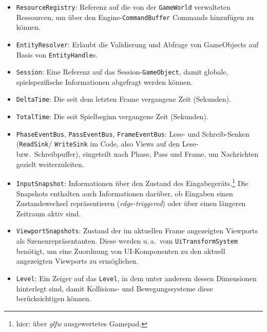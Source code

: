 \begin{itemize}
    \itemsep0.5em
    \item \texttt{ResourceRegistry}: Referenz auf die von der \texttt{GameWorld} verwalteten Ressourcen, um über den Engine-\texttt{CommandBuffer} Commands hinzufügen zu können.
    \item \texttt{EntityResolver}: Erlaubt die Validierung und Abfrage von GameObjects auf Basis von \texttt{EntityHandle}s.
    \item \texttt{Session}: Eine Referenz auf das Session-\texttt{GameObject}, damit globale, spielspezifische Informationen abgefragt werden können.
    \item \texttt{DeltaTime}: Die seit dem letzten Frame vergangene Zeit (Sekunden).
    \item \texttt{TotalTime}: Die seit Spielbeginn vergangene Zeit (Sekunden).
    \item \texttt{PhaseEventBus}, \texttt{PassEventBus}, \texttt{FrameEventBus}: Lese- und Schreib-Senken (\texttt{ReadSink}/ \texttt{WriteSink} im Code, also Views auf den Lese- bzw.\ Schreibpuffer), eingeteilt nach Phase, Pass und Frame, um Nachrichten gezielt weiterzuleiten.
    \item \texttt{InputSnapshot}: Informationen über den Zustand des Eingabegeräts.\footnote{
        hier: über \textit{glfw} ausgewertetes Gamepad.
    }
    Die Snapshots enthalten auch Informationen darüber, ob Eingaben einen Zustandswechsel repräsentieren (\textit{edge-triggered}) oder über einen längeren Zeitraum aktiv sind.
    \item \texttt{ViewportSnapshots}: Zustand der im aktuellen Frame angezeigten Viewports als Szenenrepräsentanten.
    Diese werden u.\,a.\ vom \texttt{UiTransformSystem} benötigt, um eine Zuordnung von UI-Komponenten zu den aktuell angezeigten Viewports zu ermöglichen.
    \item \texttt{Level}: Ein Zeiger auf das \texttt{Level}, in dem unter anderem dessen Dimensionen hinterlegt sind, damit Kollisions- und Bewegungssysteme diese berücksichtigen können.
\end{itemize}

